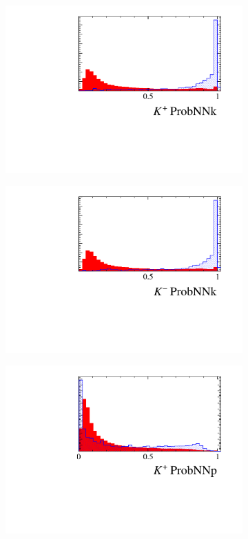 \begin{figure}[!h]
\begin{subfigure}[t]{0.22\textwidth}
      \includegraphics[width=1.0\textwidth]{figs/Selection/Phi_BDT_Var_Ds2KKPi_Phi_K0_MC15TuneV1_ProbNNk.pdf}
   \end{subfigure}
   \begin{subfigure}[t]{0.22\textwidth}
      \centering
      \includegraphics[width=1.0\textwidth]{figs/Selection/Phi_BDT_Var_Ds2KKPi_Phi_K1_MC15TuneV1_ProbNNk.pdf}
   \end{subfigure}
   \begin{subfigure}[t]{0.22\textwidth}
      \centering
      \includegraphics[width=1.0\textwidth]{figs/Selection/Phi_BDT_Var_Ds2KKPi_Phi_K0_MC15TuneV1_ProbNNp.pdf}

\end{subfigure}
\end{figure}
